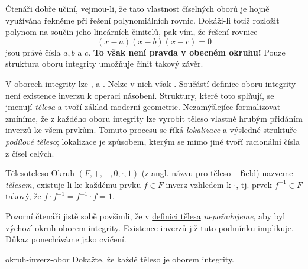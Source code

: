 Čtenáři dobře učiní, vejmou-li, že tato vlastnost číselných oborů je hojně
využívána řekněme při řešení polynomiálních rovnic. Dokáži-li totiž rozložit
polynom na součin jeho lineárních činitelů, pak vím, že řešení rovnice
\[
 (x-a)(x-b)(x-c) = 0
\]
jsou právě čísla $a,b$ a $c$. \textbf{To však není pravda v obecném okruhu!}
Pouze struktura oboru integrity umožňuje činit takový závěr.

V oborech integrity lze ,  a . Nelze v nich
však . Součástí definice oboru integrity není existence inverzu k
operaci násobení. Struktury, které toto splňují, se jmenují \emph{tělesa} a
tvoří základ moderní geometrie. Nezamýšlejíce formalizovat zmíníme, že z každého
oboru integrity lze vyrobit těleso vlastně hrubým přidáním inverzů ke všem
prvkům. Tomuto procesu se říká \emph{lokalizace} a výsledné struktuře
\emph{podílové těleso}; lokalizace je způsobem, kterým se mimo jiné tvoří
racionální čísla z čísel celých.

\begin{definition}{Těleso}{teleso}
 Okruh $(F,+,-,0, \cdot ,1)$ (z angl. názvu pro těleso -- \textbf{f}ield)
 nazveme \emph{tělesem}, existuje-li ke každému prvku $f \in F$ inverz vzhledem
 k $ \cdot $, tj. prvek $f^{-1} \in F$ takový, že $f \cdot f^{-1} = f^{-1} \cdot
 f = 1$.
\end{definition}

Pozorní čtenáři jistě sobě povšimli, že v \hyperref[def:teleso]{definici tělesa}
\emph{nepožadujeme}, aby byl výchozí okruh oborem integrity. Existence inverzů
již tuto podmínku implikuje. Důkaz ponecháváme jako cvičení.

\begin{exercise}{}{okruh-inverz-obor}
 Dokažte, že každé těleso je oborem integrity.
\end{exercise}
